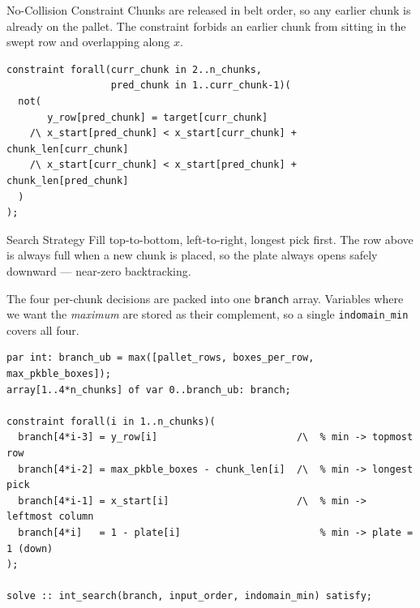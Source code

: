 \documentclass[aspectratio=169,xcolor=dvipsnames]{beamer}
\begin{document}
\begin{frame}[fragile]{No-Collision Constraint}
    Chunks are released in belt order, so any earlier chunk is already on the pallet.
    The constraint forbids an earlier chunk from sitting in the swept row and overlapping along $x$.

    \vspace{0.3cm}
    \begin{lstlisting}
constraint forall(curr_chunk in 2..n_chunks,
                  pred_chunk in 1..curr_chunk-1)(
  not(
       y_row[pred_chunk] = target[curr_chunk]
    /\ x_start[pred_chunk] < x_start[curr_chunk] + chunk_len[curr_chunk]
    /\ x_start[curr_chunk] < x_start[pred_chunk] + chunk_len[pred_chunk]
  )
);
    \end{lstlisting}
\end{frame}


\begin{frame}[fragile]{Search Strategy}
    Fill top-to-bottom, left-to-right, longest pick first.
    The row above is always full when a new chunk is placed,
    so the plate always opens safely downward — near-zero backtracking.

    \vspace{0.25cm}
    The four per-chunk decisions are packed into one \texttt{branch} array.
    Variables where we want the \emph{maximum} are stored as their complement,
    so a single \texttt{indomain\_min} covers all four.

    \vspace{0.2cm}
    \begin{lstlisting}
par int: branch_ub = max([pallet_rows, boxes_per_row, max_pkble_boxes]);
array[1..4*n_chunks] of var 0..branch_ub: branch;

constraint forall(i in 1..n_chunks)(
  branch[4*i-3] = y_row[i]                        /\  % min -> topmost row
  branch[4*i-2] = max_pkble_boxes - chunk_len[i]  /\  % min -> longest pick
  branch[4*i-1] = x_start[i]                      /\  % min -> leftmost column
  branch[4*i]   = 1 - plate[i]                        % min -> plate = 1 (down)
);

solve :: int_search(branch, input_order, indomain_min) satisfy;
    \end{lstlisting}
\end{frame}

\end{document}
